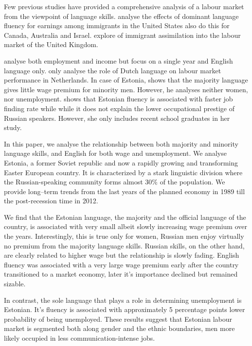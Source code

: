 \documentclass[12pt, a4paper]{article}
\begin{document}
Few previous studies have provided a comprehensive analysis of a labour
market from the viewpoint of language skills.
\citet{Chiswick1995, chiswick+miller2002, chiswick+miller2007, Bellante1998, Chiswick2010} analyse the effects of dominant language fluency for earnings among immigrants in the United States
\citet{Chiswick1995}  also do this for Canada, Australia and Israel.
\citet{Dustmann2003, shields+price2002} explore of immigrant assimilation into the labour market of the United Kingdom.


\citet{leslie+lindley2001} analyse both employment and income but
focus on a single year and English language only.
\citet{YaoandOurs2015} only analyse the role of Dutch language
on labour market performance in Netherlands.  
In case of Estonia,
\citet{Toomet2011} shows that the majority language gives little wage
premium for minority men.  However, he analyses neither women, nor
unemployment.  \citet{Lindemann2013} shows that Estonian fluency
is associated with faster job finding rate while while it does not
explain the lower occupational prestige of Russian speakers.  However,
she only includes recent school graduates in her study.

In this paper, we analyse the relationship between both
majority and minority language skills, and English for both
wage and unemployment.  We analyse Estonia, a former Soviet republic
and now a rapidly growing and
transforming Easter European country.  It is characterized by a stark linguistic division
where the Russian-speaking community forms almost 30\% of
the population.  We provide long--term trends from the last years
of the planned economy in 1989 till the post-recession time in 2012.

We find that the Estonian language, the majority and the official
language of the country, is associated with very
small albeit slowly increasing wage premium over
the years.  Interestingly, this is true only for women, Russian men enjoy
virtually no premium from the majority language skills.
Russian skills, on the other hand, are clearly related to
higher wage but the relationship is slowly fading.  English fluency was
associated with a very large wage premium early after the country
transitioned to a market economy, later it's importance
declined but remained sizable.  

In contrast, the sole language that plays a role in determining
unemployment is Estonian.  It's fluency is associated with
approximately 5 percentage points lower probability of being unemployed.
These results suggest that Estonian labour market is
segmented both along gender and the ethnic boundaries, men
more likely occupied in less communication-intense jobs.
\end{document}
